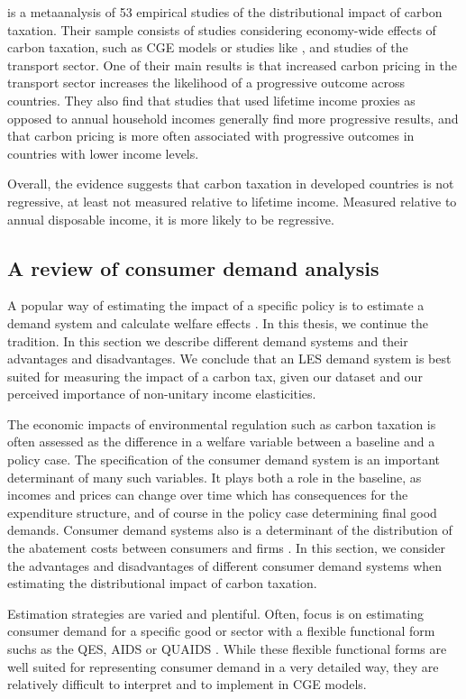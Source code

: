 \cite{meta_carbontax} is a metaanalysis of 53 empirical studies of the distributional impact of carbon taxation. Their sample consists of studies considering economy-wide effects of carbon taxation, such as CGE models or studies like \cite{Wier2005}, and studies of the transport sector. One of their main results is that increased carbon pricing in the transport sector increases the likelihood of a progressive outcome across countries. They also find that studies that used lifetime income proxies as opposed to annual household incomes generally find more progressive results, and that carbon pricing is more often associated with progressive outcomes in countries with lower income levels. 

Overall, the evidence suggests that carbon taxation in developed countries is not regressive, at least not measured relative to lifetime income. Measured relative to annual disposable income, it is more likely to be regressive.

\subsection{A review of consumer demand analysis}
A popular way of estimating the impact of a specific policy is to estimate a demand system and calculate welfare effects \citep{shojaeddiniconsumer}. In this thesis, we continue the tradition. In this section we describe different demand systems and their advantages and disadvantages. We conclude that an LES demand system is best suited for measuring the impact of a carbon tax, given our dataset and our perceived importance of non-unitary income elasticities.

The economic impacts of environmental regulation such as carbon taxation is often assessed as the difference in a welfare variable between a baseline and a policy case. The specification of the consumer demand system is an  important determinant of many such variables. It plays both a role in the baseline, as incomes and prices can change over time which has consequences for the expenditure structure, and of course in the policy case determining final good demands. Consumer demand systems also is a determinant of the distribution of the abatement costs between consumers and firms \citep{shojaeddiniconsumer}. In this section, we consider the advantages and disadvantages of different consumer demand systems when estimating the distributional impact of carbon taxation.

Estimation strategies are varied and plentiful. Often, focus is on estimating consumer demand for a specific good or sector with a flexible functional form suchs as the QES, AIDS or QUAIDS \citep{pollak1992demand,shojaeddiniconsumer}. While these flexible functional forms are well suited for representing consumer demand in a very detailed way, they are relatively difficult to interpret and to implement in CGE models. 

